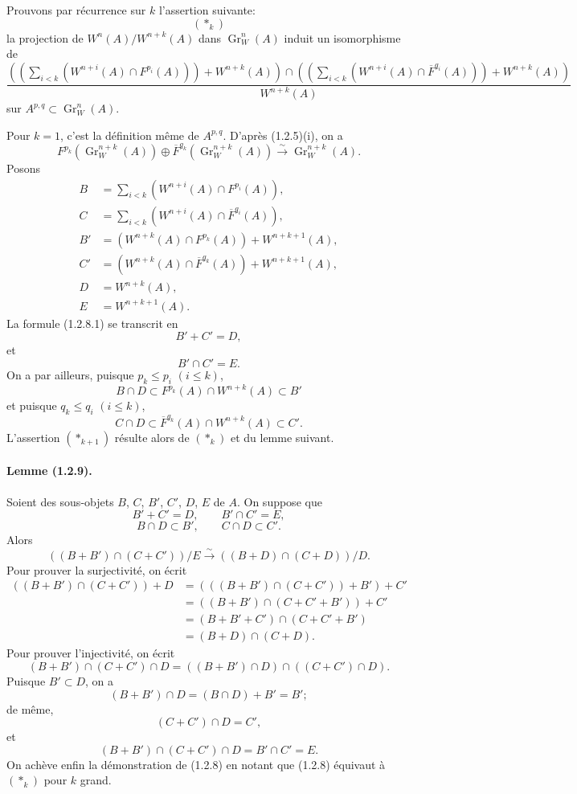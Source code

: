 \documentclass[10pt]{article}
\newcommand{\Gr}{\operatorname{Gr}}
\newcommand{\iso}{\xrightarrow{\sim}}
\begin{document}
Prouvons par récurrence sur $k$ l'assertion suivante:
\[
(*_k)
\]
la projection de $W^n(A)/W^{n+k}(A)$ dans $\Gr_W^n(A)$ induit un isomorphisme de
\[
\frac{\left(\left(\sum_{i<k}(W^{n+i}(A)\cap F^{p_i}(A))\right)+W^{n+k}(A)\right)
\cap
\left(\left(\sum_{i<k}(W^{n+i}(A)\cap\overline F^{q_i}(A))\right)+W^{n+k}(A)\right)}{W^{n+k}(A)}
\]
sur $A^{p,q}\subset\Gr_W^n(A)$.

Pour $k=1$, c'est la définition même de $A^{p,q}$. D'après (1.2.5)(i), on a
\[
\tag{1.2.8.1}
F^{p_k}(\Gr_W^{n+k}(A))\oplus \overline F^{q_k}(\Gr_W^{n+k}(A))\iso \Gr_W^{n+k}(A).
\]
Posons
\begin{align*}
B&=\sum_{i<k}(W^{n+i}(A)\cap F^{p_i}(A)),\\
C&=\sum_{i<k}(W^{n+i}(A)\cap\overline F^{q_i}(A)),\\
B'&=(W^{n+k}(A)\cap F^{p_k}(A))+W^{n+k+1}(A),\\
C'&=(W^{n+k}(A)\cap\overline F^{q_k}(A))+W^{n+k+1}(A),\\
D&=W^{n+k}(A),\\
E&=W^{n+k+1}(A).
\end{align*}
La formule (1.2.8.1) se transcrit en
\[
B'+C'=D,
\]
et
\[
B'\cap C'=E.
\]
On a par ailleurs, puisque $p_k\le p_i$ $(i\le k)$,
\[
B\cap D\subset F^{p_k}(A)\cap W^{n+k}(A)\subset B'
\]
et puisque $q_k\le q_i$ $(i\le k)$,
\[
C\cap D\subset \overline F^{q_k}(A)\cap W^{n+k}(A)\subset C'.
\]
L'assertion $(*_{k+1})$ résulte alors de $(*_k)$ et du lemme suivant.

\paragraph{Lemme (1.2.9).} Soient des sous-objets $B$, $C$, $B'$, $C'$, $D$, $E$ de $A$. On suppose que
\[
B'+C'=D,
\qquad
B'\cap C'=E,
\]
\[
B\cap D\subset B',
\qquad
C\cap D\subset C'.
\]
Alors
\[
((B+B')\cap(C+C'))/E\iso((B+D)\cap(C+D))/D.
\]
Pour prouver la surjectivité, on écrit
\begin{align*}
((B+B')\cap(C+C'))+D
&=(((B+B')\cap(C+C'))+B')+C'\\
&=((B+B')\cap(C+C'+B'))+C'\\
&=(B+B'+C')\cap(C+C'+B')\\
&=(B+D)\cap(C+D).
\end{align*}
Pour prouver l'injectivité, on écrit
\[
(B+B')\cap(C+C')\cap D=((B+B')\cap D)\cap((C+C')\cap D).
\]
Puisque $B'\subset D$, on a
\[
(B+B')\cap D=(B\cap D)+B'=B';
\]
de même,
\[
(C+C')\cap D=C',
\]
et
\[
(B+B')\cap(C+C')\cap D=B'\cap C'=E.
\]
On achève enfin la démonstration de (1.2.8) en notant que (1.2.8) équivaut à $(*_k)$ pour $k$ grand.
\end{document}
